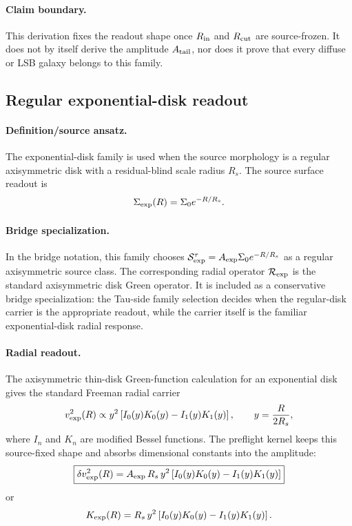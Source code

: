 \documentclass[11pt]{article}
\begin{document}
\paragraph{Claim boundary.}
This derivation fixes the readout shape once \(R_{\rm in}\) and
\(R_{\rm cut}\) are source-frozen.  It does not by itself derive the amplitude
\(A_{\rm tail}\), nor does it prove that every diffuse or LSB galaxy belongs to
this family.

\subsection{Regular exponential-disk readout}

\paragraph{Definition/source ansatz.}
The exponential-disk family is used when the source morphology is a regular
axisymmetric disk with a residual-blind scale radius \(R_s\).  The source
surface readout is
\[
\Sigma_{\rm exp}(R)=\Sigma_0 e^{-R/R_s}.
\]

\paragraph{Bridge specialization.}
In the bridge notation, this family chooses
\(\mathcal S_{\rm exp}^\tau=A_{\rm exp}\Sigma_0 e^{-R/R_s}\) as a regular
axisymmetric source class.  The corresponding radial operator
\(\mathcal R_{\rm exp}\) is the standard axisymmetric disk Green operator.  It
is included as a conservative bridge specialization: the Tau-side family
selection decides when the regular-disk carrier is the appropriate readout,
while the carrier itself is the familiar exponential-disk radial response.

\paragraph{Radial readout.}
The axisymmetric thin-disk Green-function calculation for an exponential disk
gives the standard Freeman radial carrier \cite{Freeman1970Disk}
\[
v_{\rm exp}^2(R)
\propto
y^2\left[I_0(y)K_0(y)-I_1(y)K_1(y)\right],
\qquad
y=\frac{R}{2R_s},
\]
where \(I_n\) and \(K_n\) are modified Bessel functions.  The preflight kernel
keeps this source-fixed shape and absorbs dimensional constants into the
amplitude:
\[
\boxed{
\delta v_{\rm exp}^2(R)
=
A_{\rm exp}\,
R_s\,y^2\left[I_0(y)K_0(y)-I_1(y)K_1(y)\right]
}
\]
or
\[
K_{\rm exp}(R)=
R_s\,y^2\left[I_0(y)K_0(y)-I_1(y)K_1(y)\right].
\]
\end{document}
